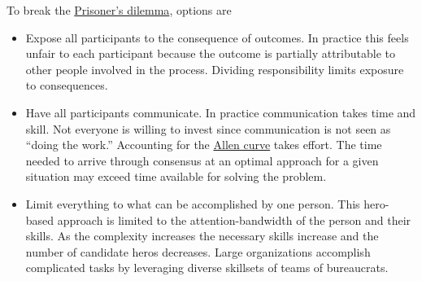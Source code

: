 
To break the \href{https://en.wikipedia.org/wiki/Prisoner\%27s\_dilemma}{Prisoner's dilemma}, options are 
\begin{itemize}
    \item Expose all participants to the consequence of outcomes. In practice this feels unfair to each participant because the outcome is partially attributable to other people involved in the process. Dividing responsibility limits exposure to consequences.
    \item Have all participants communicate. In practice communication takes time and skill. Not everyone is willing to invest since communication is not seen as ``doing the work.'' Accounting for the \href{https://en.wikipedia.org/wiki/Allen\_curve}{Allen curve} takes effort. The time needed to arrive through consensus at an optimal approach for a given situation may exceed time available for solving the problem.
    \item Limit everything to what can be accomplished by one person. This hero-based approach is limited to the attention-bandwidth of the person and their skills. As the complexity increases the necessary skills increase and the number of candidate heros decreases. Large organizations accomplish complicated tasks by leveraging diverse skillsets of teams of bureaucrats.

\end{itemize}


 
 